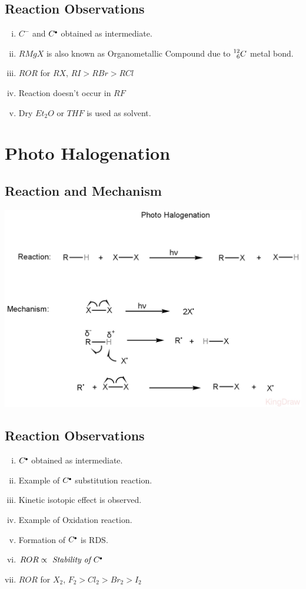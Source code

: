 \documentclass{article}
\newcommand*\fullcirc[1][0.3ex]{\tikz\fill (0,0) circle (#1);}
\begin{document}
\subsection{Reaction Observations}
\begin{enumerate}[i.]
    \item $C^-$ and $C^{\fullcirc}$ obtained as intermediate.
    \item $RMgX$ is also known as Organometallic Compound due to $\prescript{12}{6}{C}$ metal bond.
    \item $ROR$ for $RX$, $RI>RBr>RCl$
    \item Reaction doesn't occur in $RF$
    \item Dry $Et_{2}O$ or $THF$ is used as solvent.
\end{enumerate}

\section{Photo Halogenation}
\subsection{Reaction and Mechanism}
\begin{center}
    \includegraphics[scale=0.3]{PhotoHalogenanion_1722173018626.JPEG}
\end{center}

\subsection{Reaction Observations}
\begin{enumerate}[i.]
    \item $C^{\fullcirc}$ obtained as intermediate.
    \item Example of $C^{\fullcirc}$ substitution reaction.
    \item Kinetic isotopic effect is observed.
    \item Example of Oxidation reaction.
    \item Formation of $C^{\fullcirc}$ is RDS.
    \item $ROR \propto \textit{ Stability of } C^{\fullcirc}$
    \item $ROR$ for $X_{2}$, $F_{2}>Cl_{2}>Br_{2}>I_{2}$
\end{enumerate}
\end{document}
